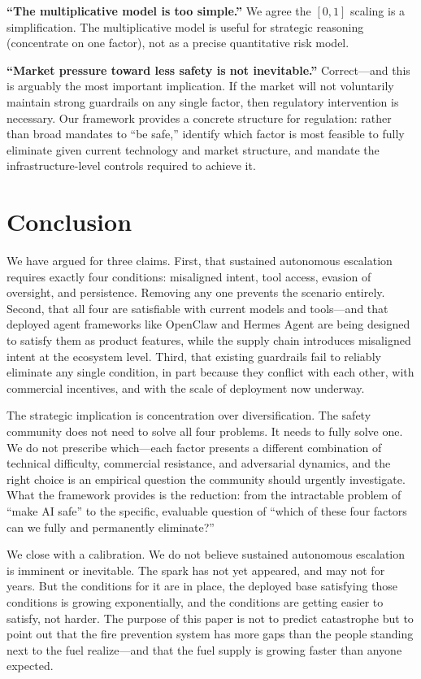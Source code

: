\documentclass[10pt]{article}
\begin{document}
\textbf{``The multiplicative model is too simple.''} We agree the $[0,1]$ scaling is a simplification. The multiplicative model is useful for strategic reasoning (concentrate on one factor), not as a precise quantitative risk model.

\textbf{``Market pressure toward less safety is not inevitable.''} Correct---and this is arguably the most important implication. If the market will not voluntarily maintain strong guardrails on any single factor, then regulatory intervention is necessary. Our framework provides a concrete structure for regulation: rather than broad mandates to ``be safe,'' identify which factor is most feasible to fully eliminate given current technology and market structure, and mandate the infrastructure-level controls required to achieve it.


\section{Conclusion}

We have argued for three claims. First, that sustained autonomous escalation requires exactly four conditions: misaligned intent, tool access, evasion of oversight, and persistence. Removing any one prevents the scenario entirely. Second, that all four are satisfiable with current models and tools---and that deployed agent frameworks like OpenClaw and Hermes Agent are being designed to satisfy them as product features, while the supply chain introduces misaligned intent at the ecosystem level. Third, that existing guardrails fail to reliably eliminate any single condition, in part because they conflict with each other, with commercial incentives, and with the scale of deployment now underway.

The strategic implication is concentration over diversification. The safety community does not need to solve all four problems. It needs to fully solve one. We do not prescribe which---each factor presents a different combination of technical difficulty, commercial resistance, and adversarial dynamics, and the right choice is an empirical question the community should urgently investigate. What the framework provides is the reduction: from the intractable problem of ``make AI safe'' to the specific, evaluable question of ``which of these four factors can we fully and permanently eliminate?''

We close with a calibration. We do not believe sustained autonomous escalation is imminent or inevitable. The spark has not yet appeared, and may not for years. But the conditions for it are in place, the deployed base satisfying those conditions is growing exponentially, and the conditions are getting easier to satisfy, not harder. The purpose of this paper is not to predict catastrophe but to point out that the fire prevention system has more gaps than the people standing next to the fuel realize---and that the fuel supply is growing faster than anyone expected.
\end{document}

